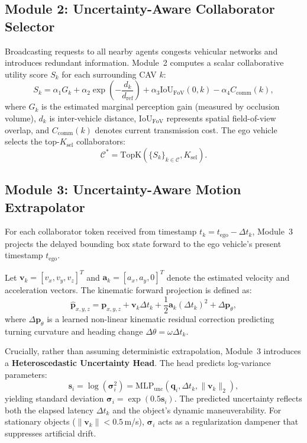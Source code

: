 \documentclass[10pt,journal,compsoc]{IEEEtran}
\begin{document}
\subsection{Module 2: Uncertainty-Aware Collaborator Selector}
Broadcasting requests to all nearby agents congests vehicular networks and introduces redundant information. Module~2 computes a scalar collaborative utility score $S_k$ for each surrounding CAV $k$:
\begin{equation}
S_k = \alpha_1 G_k + \alpha_2 \exp\left(-\frac{d_k}{d_{\mathrm{ref}}}\right) + \alpha_3 \mathrm{IoU}_{\mathrm{FoV}}(0, k) - \alpha_4 C_{\mathrm{comm}}(k),
\end{equation}
where $G_k$ is the estimated marginal perception gain (measured by occlusion volume), $d_k$ is inter-vehicle distance, $\mathrm{IoU}_{\mathrm{FoV}}$ represents spatial field-of-view overlap, and $C_{\mathrm{comm}}(k)$ denotes current transmission cost. The ego vehicle selects the top-$K_{\mathrm{sel}}$ collaborators:
\begin{equation}
\mathcal{C}^* = \mathrm{TopK}\left(\{S_k\}_{k \in \mathcal{C}}, K_{\mathrm{sel}}\right).
\end{equation}

\subsection{Module 3: Uncertainty-Aware Motion Extrapolator}
For each collaborator token received from timestamp $t_k = t_{\text{ego}} - \Delta t_k$, Module~3 projects the delayed bounding box state forward to the ego vehicle's present timestamp $t_{\text{ego}}$.

Let $\mathbf{v}_k = [v_x, v_y, v_z]^T$ and $\mathbf{a}_k = [a_x, a_y, 0]^T$ denote the estimated velocity and acceleration vectors. The kinematic forward projection is defined as:
\begin{equation}
\hat{\mathbf{p}}_{x,y,z} = \mathbf{p}_{x,y,z} + \mathbf{v}_k \Delta t_k + \frac{1}{2} \mathbf{a}_k (\Delta t_k)^2 + \Delta \mathbf{p}_{\theta},
\end{equation}
where $\Delta \mathbf{p}_{\theta}$ is a learned non-linear kinematic residual correction predicting turning curvature and heading change $\Delta \theta = \omega \Delta t_k$.

Crucially, rather than assuming deterministic extrapolation, Module~3 introduces a \textbf{Heteroscedastic Uncertainty Head}. The head predicts log-variance parameters:
\begin{equation}
\mathbf{s}_i = \log(\bm{\sigma}_i^2) = \mathrm{MLP}_{\mathrm{unc}}(\mathbf{q}_i, \Delta t_k, \|\mathbf{v}_k\|_2),
\end{equation}
yielding standard deviation $\bm{\sigma}_i = \exp(0.5 \mathbf{s}_i)$. The predicted uncertainty reflects both the elapsed latency $\Delta t_k$ and the object's dynamic maneuverability. For stationary objects ($\|\mathbf{v}_k\| < 0.5$\,m/s), $\bm{\sigma}_i$ acts as a regularization dampener that suppresses artificial drift.
\end{document}
